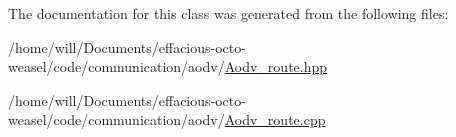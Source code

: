 The documentation for this class was generated from the following files\+:\begin{DoxyCompactItemize}
\item 
/home/will/\+Documents/effacious-\/octo-\/weasel/code/communication/aodv/\hyperlink{_aodv__route_8hpp}{Aodv\+\_\+route.\+hpp}\item 
/home/will/\+Documents/effacious-\/octo-\/weasel/code/communication/aodv/\hyperlink{_aodv__route_8cpp}{Aodv\+\_\+route.\+cpp}\end{DoxyCompactItemize}
